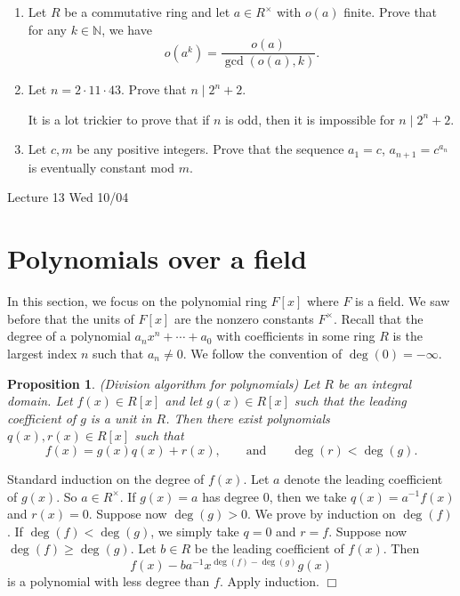 \documentclass{article}
\def\N{{\mathbb N}}
\newtheorem{proposition}[subsection]{Proposition}
\newenvironment{proof}{\noindent {\bf Proof:}}{$\Box$ \vspace{2 ex}}
\newcommand{\add}[1]{{\color{blue} #1}}
\begin{document}
\begin{enumerate}[\thesection .1]
    \item Let $R$ be a commutative ring and let $a\in R^\times$ with $o(a)$ finite. Prove that for any $k\in\N$, we have $$o(a^k) = \frac{o(a)}{\gcd(o(a),k)}.$$\label{exer:8.7}
    
    \item Let $n = 2\cdot 11\cdot 43$. Prove that $n\mid 2^n+2$.

    It is a lot trickier to prove that if $n$ is odd, then it is impossible for $n\mid 2^n + 2$.
    
    \item Let $c,m$ be any positive integers. Prove that the sequence $a_1 = c$, $a_{n+1} = c^{a_n}$ is eventually constant mod $m$.
\end{enumerate}

\begin{center}
    \add{Lecture 13 Wed 10/04}
\end{center}
\section{Polynomials over a field}

In this section, we focus on the polynomial ring $F[x]$ where $F$ is a field. We saw before that the units of $F[x]$ are the nonzero constants $F^\times$. Recall that the degree of a polynomial $a_nx^n + \cdots + a_0$ with coefficients in some ring $R$ is the largest index $n$ such that $a_n\neq 0$. We follow the convention of $\deg(0) = -\infty$.

\begin{proposition}
    (Division algorithm for polynomials) Let $R$ be an integral domain. Let $f(x)\in R[x]$ and let $g(x)\in R[x]$ such that the leading coefficient of $g$ is a unit in $R$. Then there exist polynomials $q(x),r(x)\in R[x]$ such that $$f(x) = g(x)q(x) + r(x),\qquad\mbox{and}\qquad \deg(r) < \deg(g).$$
\end{proposition}

\begin{proof}
    Standard induction on the degree of $f(x)$. Let $a$ denote the leading coefficient of $g(x)$. So $a\in R^\times$. If $g(x) = a$ has degree $0$, then we take $q(x) = a^{-1}f(x)$ and $r(x) = 0$. Suppose now $\deg(g) > 0.$ We prove by induction on $\deg(f)$. If $\deg(f) < \deg(g)$, we simply take $q = 0$ and $r = f$. Suppose now $\deg(f) \geq \deg(g)$. Let $b\in R$ be the leading coefficient of $f(x)$. Then $$f(x) - ba^{-1}x^{\deg(f) - \deg(g)}g(x)$$
    is a polynomial with less degree than $f$. Apply induction.
\end{proof}
\end{document}
